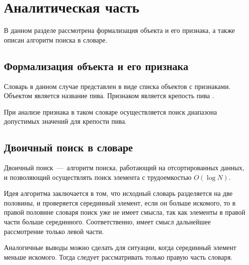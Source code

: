 \chapter{Аналитическая часть}

В данном разделе рассмотрена формализация объекта и его признака, а также описан алгоритм поиска в словаре.

\section{Формализация объекта и его признака}
Словарь в данном случае представлен в виде списка объектов с признаками. Объектом является название пива. Признаком является крепость пива \cite{bib:1}.

При анализе признака в таком словаре осуществляется поиск диапазона допустимых значений для крепости пива.

\section{Двоичный поиск в словаре}
Двоичный поиск~---~алгоритм поиска, работающий на отсортированных данных, и позволяющий осуществлять поиск элемента с трудоемкостью $O(\log N)$. 

Идея алгоритма заключается в том, что исходный словарь разделяется на две половины, и проверяется серединный элемент, если он больше искомого, то в правой половине словаря поиск уже не имеет смысла, так как элементы в правой части больше серединного. Соответственно, имеет смысл дальнейшее рассмотрение только левой части.

Аналогичные выводы можно сделать для ситуации, когда серединный элемент меньше искомого. Тогда следует рассматривать только правую часть словаря.

\newpage